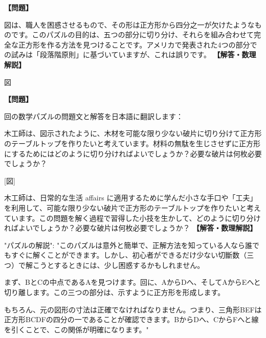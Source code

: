 \documentclass[10pt,a4paper,oneside,openany]{ltjsbook}
\begin{document}
\begin{tcolorbox}[colback=softblue,colframe=primaryblue,title=\textbf{第 150 問：ミトラを分割する （原題: DISSECTING A MITRE.）},arc=2mm,boxrule=1pt,breakable]
\textbf{【問題】}\par\vspace{0.3em}
図は、職人を困惑させるもので、その形は正方形から四分之一が欠けたようなものです。このパズルの目的は、五つの部分に切り分け、それらを組み合わせて完全な正方形を作る方法を見つけることです。アメリカで発表された4つの部分での試みは「段落階原則」に基づいていますが、これは誤りです。
\tcblower
\textbf{【解答・数理解説】}\par\vspace{0.3em}
図
\end{tcolorbox}

\begin{tcolorbox}[colback=softblue,colframe=primaryblue,title=\textbf{第 151 問：THE JOINER'S PROBLEM.},arc=2mm,boxrule=1pt,breakable]
\textbf{【問題】}\par\vspace{0.3em}
回の数学パズルの問題文と解答を日本語に翻訳します：

木工師は、図示されたように、木材を可能な限り少ない破片に切り分けて正方形のテーブルトップを作りたいと考えています。材料の無駄を生じさせずに正方形にするためにはどのように切り分ければよいでしょうか？必要な破片は何枚必要でしょうか？

[図]

木工師は、日常的な生活 affairs に適用するために学んだ小さな手口や「工夫」を利用して、可能な限り少ない破片で正方形のテーブルトップを作りたいと考えています。この問題を解く過程で習得した小技を生かして、どのように切り分ければよいでしょうか？必要な破片は何枚必要でしょうか？
\tcblower
\textbf{【解答・数理解説】}\par\vspace{0.3em}
{
"パズルの解説": "このパズルは意外と簡単で、正解方法を知っている人なら誰でもすぐに解くことができます。しかし、初心者ができるだけ少ない切斷数（三つ）で解こうとするときには、少し困惑するかもしれません。

まず、BとCの中点であるAを見つけます。回に、AからDへ、そしてAからEへと切り離します。この三つの部分は、示すように正方形を形成します。

もちろん、元の図形の寸法は正確でなければなりません。つまり、三角形BEFは正方形BCDFの四分の一であることが確認できます。BからDへ、CからFへと線を引くことで、この関係が明確になります。"
}
\end{tcolorbox}
\end{document}
